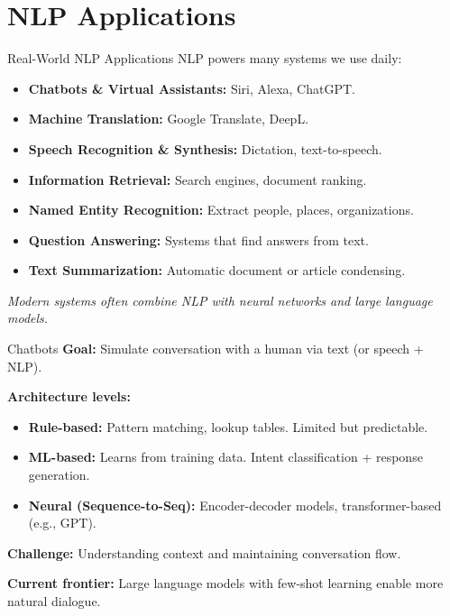 \documentclass[10pt]{beamer}
\begin{document}
\section{NLP Applications}

\begin{frame}{Real-World NLP Applications}
    NLP powers many systems we use daily:
    \begin{itemize}
        \item \textbf{Chatbots \& Virtual Assistants:} Siri, Alexa, ChatGPT.
        \item \textbf{Machine Translation:} Google Translate, DeepL.
        \item \textbf{Speech Recognition \& Synthesis:} Dictation, text-to-speech.
        \item \textbf{Information Retrieval:} Search engines, document ranking.
        \item \textbf{Named Entity Recognition:} Extract people, places, organizations.
        \item \textbf{Question Answering:} Systems that find answers from text.
        \item \textbf{Text Summarization:} Automatic document or article condensing.
    \end{itemize}

    \vspace{0.2cm}
    \textit{Modern systems often combine NLP with neural networks and large language models.}
\end{frame}

\begin{frame}{Chatbots}
    \textbf{Goal:} Simulate conversation with a human via text (or speech + NLP).

    \vspace{0.2cm}
    \textbf{Architecture levels:}
    \begin{itemize}
        \item \textbf{Rule-based:} Pattern matching, lookup tables. Limited but predictable.
        \item \textbf{ML-based:} Learns from training data. Intent classification + response generation.
        \item \textbf{Neural (Sequence-to-Seq):} Encoder-decoder models, transformer-based (e.g., GPT).
    \end{itemize}

    \vspace{0.2cm}
    \textbf{Challenge:} Understanding context and maintaining conversation flow.

    \vspace{0.2cm}
    \textbf{Current frontier:} Large language models with few-shot learning enable more natural dialogue.
\end{frame}
\end{document}
